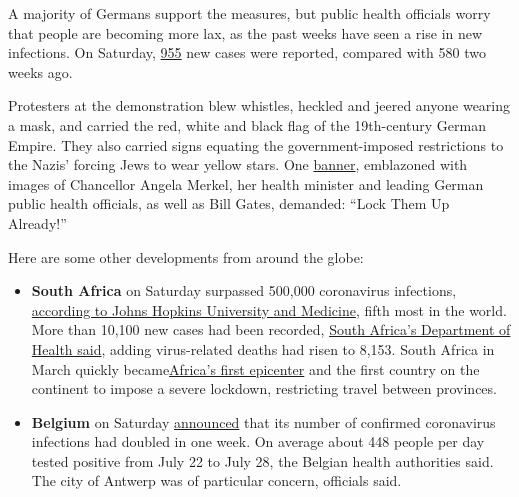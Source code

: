 A majority of Germans support the measures, but public health officials
worry that people are becoming more lax, as the past weeks have seen a
rise in new infections. On Saturday,
\href{https://www.rki.de/DE/Content/InfAZ/N/Neuartiges_Coronavirus/Situationsberichte/2020-08-01-en.pdf?__blob=publicationFile}{955}
new cases were reported, compared with 580 two weeks ago.

Protesters at the demonstration blew whistles, heckled and jeered anyone
wearing a mask, and carried the red, white and black flag of the
19th-century German Empire. They also carried signs equating the
government-imposed restrictions to the Nazis' forcing Jews to wear
yellow stars. One
\href{https://twitter.com/BenjAlvarez1/status/1289490832815345665/photo/1}{banner},
emblazoned with images of Chancellor Angela Merkel, her health minister
and leading German public health officials, as well as Bill Gates,
demanded: ``Lock Them Up Already!''

Here are some other developments from around the globe:

\begin{itemize}
\item
  \textbf{South Africa} on Saturday surpassed 500,000 coronavirus
  infections, \href{https://coronavirus.jhu.edu/map.html}{according to
  Johns Hopkins University and Medicine}, fifth most in the world. More
  than 10,100 new cases had been recorded,
  \href{https://twitter.com/HealthZA/status/1289655436455510016}{South
  Africa's Department of Health said}, adding virus-related deaths had
  risen to 8,153. South Africa in March quickly
  became\href{https://www.nytimes.com/2020/03/27/world/africa/south-africa-coronavirus.html}{Africa's
  first epicenter} and the first country on the continent to impose a
  severe lockdown, restricting travel between provinces.
\item
  \textbf{Belgium} on Saturday
  \href{https://www.info-coronavirus.be/en/news/the-number-of-confirmed-cases-of-covid-19-has-doubled-in-one-week/}{announced}
  that its number of confirmed coronavirus infections had doubled in one
  week. On average about 448 people per day tested positive from July 22
  to July 28, the Belgian health authorities said. The city of Antwerp
  was of particular concern, officials said.
\end{itemize}

